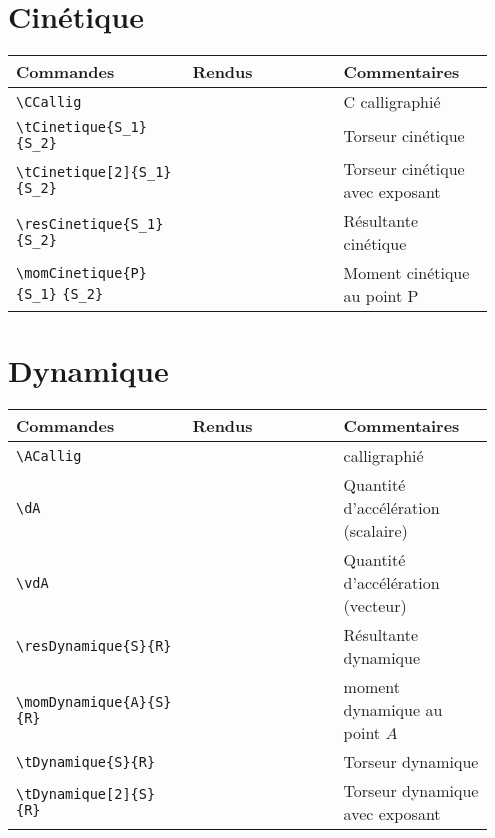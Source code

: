 \documentclass[a4paper,10pt]{article}
\begin{document}
	\section{Cinétique}
	\noindent
	\begin{tabular}{|p{0.35\linewidth}|p{0.3\linewidth}|p{0.3\linewidth}|}
		\hline
			\textbf{Commandes}&\textbf{Rendus}&\textbf{Commentaires}
		\\\hline\hline
			\verb!\CCallig!			&	\CCallig			&	C calligraphié
		\\\hline
			\verb!\tCinetique{S_1}{S_2}!			&	\tCinetique{S_1}{S_2}			&	Torseur cinétique
		\\\hline
			\verb!\tCinetique[2]{S_1}{S_2}!			&	\tCinetique[2]{S_1}{S_2}			&	Torseur cinétique avec exposant
		\\\hline
			\verb!\resCinetique{S_1}{S_2}!			&	\resCinetique{S_1}{S_2}			&	Résultante cinétique
		\\\hline
			\verb!\momCinetique{P}{S_1}! \verb!{S_2}!			&	\momCinetique{P}{S_1}{S_2}			&	Moment cinétique au point P
		\\\hline
	\end{tabular}

	\section{Dynamique}
    \noindent
	\begin{tabular}{|p{0.35\linewidth}|p{0.3\linewidth}|p{0.3\linewidth}|}
		\hline
			\textbf{Commandes}&\textbf{Rendus}&\textbf{Commentaires}
		\\\hline\hline
			\verb!\ACallig!			&	\ACallig			&	\ACallig calligraphié
		\\\hline
			\verb!\dA!			&	\dA			&	Quantité d'accélération (scalaire)
		\\\hline
			\verb!\vdA!			&	\vdA			&	Quantité d'accélération (vecteur)
		\\\hline
			\verb!\resDynamique{S}{R}!			&	\resDynamique{S}{R}			&	Résultante dynamique
		\\\hline
			\verb!\momDynamique{A}{S}{R}!			&	\momDynamique{A}{S}{R}			&	moment dynamique au point $A$
		\\\hline
			\verb!\tDynamique{S}{R}!			&	\tDynamique{S}{R}			&	Torseur dynamique
		\\\hline
			\verb!\tDynamique[2]{S}{R}!			&	\tDynamique[2]{S}{R}			&	Torseur dynamique avec exposant
		\\\hline
	\end{tabular}
\end{document}
